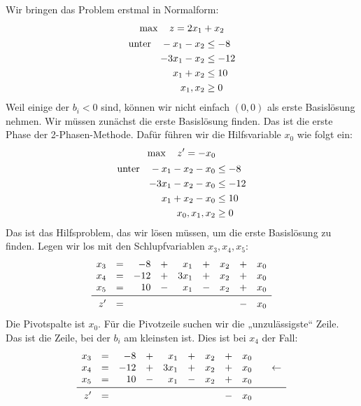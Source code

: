 \documentclass[
a4paper, %
11pt,
]
{scrartcl}
\begin{document}
Wir bringen das Problem erstmal in Normalform:
\begin{equation*}
  \begin{gathered}
    \max \quad z = 2x_1 + x_2\\
    \begin{aligned}
      \textup{unter}
      \quad
      -x_1 - x_2  & \leq -8\\
      -3x_1 - x_2 & \leq -12\\
      x_1 + x_2   & \leq 10\\
      x_1, x_2    & \geq 0
    \end{aligned}
  \end{gathered}
\end{equation*}
Weil einige der $b_i < 0$ sind, können wir nicht einfach $(0,0)$ als erste
Basislösung nehmen. Wir müssen zunächst die erste Basislösung finden. Das ist
die erste Phase der 2-Phasen-Methode. Dafür führen wir die Hilfsvariable $x_0$
wie folgt ein:
\begin{align*}
  \begin{gathered}
    \max \quad z' = -x_0\\
    \begin{aligned}
      \textup{unter}
      \quad
      -x_1 - x_2 - x_0  & \leq -8\\
      -3x_1 - x_2 - x_0 & \leq -12\\
      x_1 + x_2 - x_0   & \leq 10\\
      x_0, x_1, x_2     & \geq 0
    \end{aligned}
  \end{gathered}
\end{align*}
Das ist das Hilfsproblem, das wir lösen müssen, um die erste Basislösung zu
finden. Legen wir los mit den Schlupfvariablen $x_3, x_4, x_5$:
\begin{align*}
  \begin{array}{rcrcrcrcr}
    x_3      & = & -8  & + & x_1   & + & x_2 & + & x_0\\
    x_4      & = & -12 & + & 3 x_1 & + & x_2 & + & x_0\\
    x_5      & = & 10  & - & x_1   & - & x_2 & + & x_0\\
    \midrule
    z'       & = &     &   &       &   &     & - & x_0
  \end{array}
\end{align*}
Die Pivotspalte ist $x_0$. Für die Pivotzeile suchen wir die „unzulässigste“
Zeile. Das ist die Zeile, bei der $b_i$ am kleinsten ist. Dies ist bei $x_4$ der
Fall:
\begin{align*}
  \begin{array}{rcrcrcrcrcr}
    x_3      & = & -8  & + & x_1   & + & x_2 & + & x_0\\
    x_4      & = & -12 & + & 3 x_1 & + & x_2 & + & x_0 & & \leftarrow\\
    x_5      & = & 10  & - & x_1   & - & x_2 & + & x_0\\
    \midrule
    z'       & = &     &   &       &   &     & - & x_0
  \end{array}
\end{align*}
\end{document}

